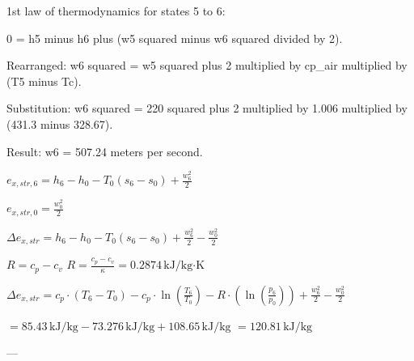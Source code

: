 1st law of thermodynamics for states 5 to 6:  

0 = h5 minus h6 plus (w5 squared minus w6 squared divided by 2).  

Rearranged:  
w6 squared = w5 squared plus 2 multiplied by cp_air multiplied by (T5 minus Tc).  

Substitution:  
w6 squared = 220 squared plus 2 multiplied by 1.006 multiplied by (431.3 minus 328.67).  

Result:  
w6 = 507.24 meters per second.

\( e_{x,str,6} = h_6 - h_0 - T_0 (s_6 - s_0) + \frac{w_6^2}{2} \)  

\( e_{x,str,0} = \frac{w_0^2}{2} \)  

\( \Delta e_{x,str} = h_6 - h_0 - T_0 (s_6 - s_0) + \frac{w_6^2}{2} - \frac{w_0^2}{2} \)  

\( R = c_p - c_v \)  
\( R = \frac{c_p - c_v}{\kappa} = 0.2874 \, \text{kJ/kg·K} \)  

\( \Delta e_{x,str} = c_p \cdot (T_6 - T_0) - c_p \cdot \ln \left( \frac{T_6}{T_0} \right) - R \cdot \left( \ln \left( \frac{p_6}{p_0} \right) \right) + \frac{w_6^2}{2} - \frac{w_0^2}{2} \)  

\( = 85.43 \, \text{kJ/kg} - 73.276 \, \text{kJ/kg} + 108.65 \, \text{kJ/kg} \)  
\( = 120.81 \, \text{kJ/kg} \)  

---